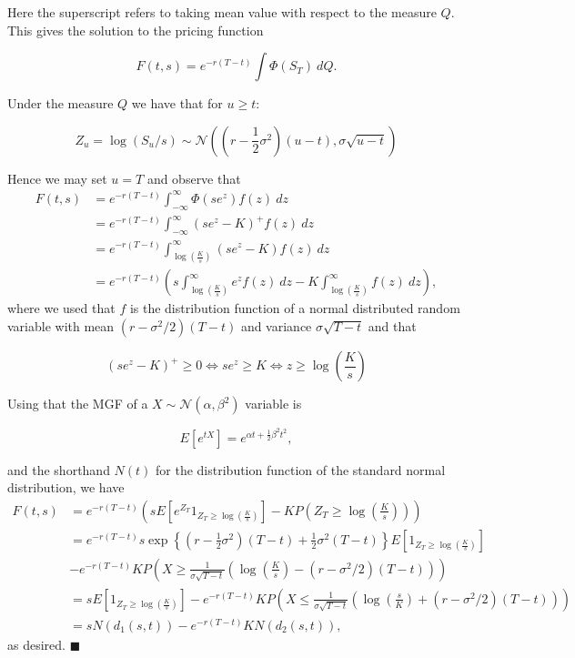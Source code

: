 \documentclass[
]{book}
\begin{document}
Here the superscript refers to taking mean value with respect to the measure \(Q\). This gives the solution to the pricing function

\[
F(t,s)=e^{-r(T-t)}\int \Phi(S_T)\ dQ.
\]

Under the measure \(Q\) we have that for \(u\ge t\):

\[
Z_u=\log (S_u/s)\sim \mathcal{N}\left(\left(r-\frac{1}{2}\sigma^2\right)(u-t),\sigma\sqrt{u-t}\right)
\]

Hence we may set \(u=T\) and observe that
\begin{align*}
F(t,s)&=e^{-r(T-t)}\int_{-\infty}^\infty \Phi(se^z) f(z)\ dz\\
&=e^{-r(T-t)}\int_{-\infty}^\infty (se^z-K)^+ f(z)\ dz\\
&=e^{-r(T-t)}\int_{\log\left(\frac{K}{s}\right)}^{\infty} (se^z-K) f(z)\ dz\\
&=e^{-r(T-t)}\left(s\int_{\log\left(\frac{K}{s}\right)}^{\infty} e^z f(z)\ dz-K\int_{\log\left(\frac{K}{s}\right)}^{\infty} f(z)\ dz\right),
\end{align*}
where we used that \(f\) is the distribution function of a normal distributed random variable with mean \((r-\sigma^2/2)(T-t)\) and variance \(\sigma\sqrt{T-t}\) and that

\[
(se^z-K)^+ \ge 0\iff se^z\ge K\iff z\ge \log\left(\frac{K}{s}\right)
\]

Using that the MGF of a \(X\sim\mathcal{N}(\alpha, \beta^2)\) variable is

\[
E[e^{tX}]=e^{\alpha t+\frac{1}{2}\beta ^2t^2},
\]

and the shorthand \(N(t)\) for the distribution function of the standard normal distribution, we have
\begin{align*}
F(t,s)&=e^{-r(T-t)}\left(sE\left[e^{Z_T}1_{Z_T\ge \log\left(\frac{K}{s}\right)}\right]-K P\left(Z_T\ge \log\left(\frac{K}{s}\right)\right)\right)\\
&=e^{-r(T-t)}s\exp\left\{\left(r-\frac{1}{2}\sigma^2\right)(T-t)+\frac{1}{2}\sigma^2(T-t)\right\}E\left[1_{Z_T\ge \log\left(\frac{K}{s}\right)}\right]\\
&-e^{-r(T-t)}K P\left(X\ge\frac{1}{\sigma\sqrt{T-t}}\left( \log\left(\frac{K}{s}\right)-(r-\sigma^2/2)(T-t)\right)\right)\\
&=sE\left[1_{Z_T\ge \log\left(\frac{K}{s}\right)}\right]-e^{-r(T-t)}K P\left(X\le\frac{1}{\sigma\sqrt{T-t}}\left(\log\left(\frac{s}{K}\right)+(r-\sigma^2/2)(T-t)\right)\right)\\
&=sN(d_1(s,t))-e^{-r(T-t)}K N\left(d_2(s,t)\right),
\end{align*}
as desired. \(\blacksquare\)
\end{document}

